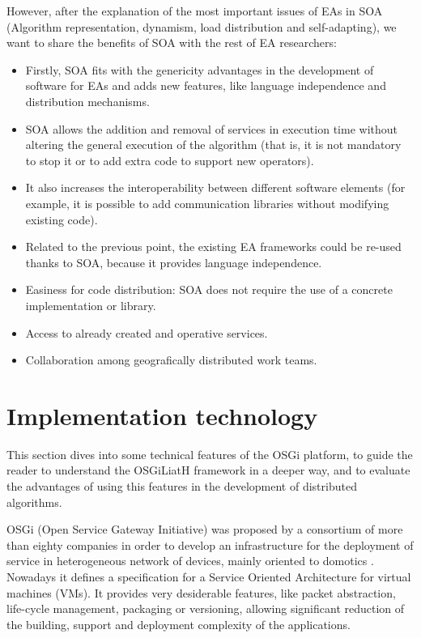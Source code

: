 \documentclass{sig-alternate}
\begin{document}
However, after the explanation of the most important issues of EAs in SOA (Algorithm representation, dynamism, load distribution and self-adapting), we want to share  the benefits of SOA with the rest of EA researchers:


\begin{itemize}
\item Firstly, SOA fits with the genericity advantages in the development of software for EAs \cite{GENERICITY05} and adds new features, like language independence and  distribution mechanisms.
\item SOA allows the addition and removal of services in execution time without altering the general execution of the algorithm (that is, it is not mandatory to stop it or to add extra code to support new operators).
\item It also increases the interoperability between different software elements (for example, it is possible to add communication libraries without modifying existing code).
\item Related to the previous point, the existing EA frameworks could be re-used thanks to SOA, because it provides language independence.
\item Easiness for code distribution: SOA does not require the use of a concrete implementation or library.
\item Access to already created and operative services.%
\item Collaboration among geografically distributed work teams.
\end{itemize}

\section{Implementation technology}
This section dives into some technical features of the OSGi platform, to guide the reader to understand the OSGiLiatH framework in a deeper way, and to evaluate the advantages of using this features in the development of distributed algorithms.

OSGi (Open Service Gateway Initiative) \cite{OSGI} was proposed by a consortium of more than
eighty companies in order to develop an infrastructure for the
deployment of service in heterogeneous network of devices, mainly
oriented to domotics \cite{OSGIOVERVIEW}. Nowadays it defines a
specification for a Service Oriented Architecture for virtual
machines (VMs). It provides very desiderable features, like
packet abstraction, life-cycle management, packaging or versioning,
allowing significant reduction of the building, support and deployment
complexity of the applications. 
\end{document}
